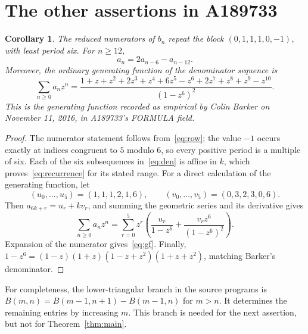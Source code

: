 \documentclass[11pt]{article}
\newtheorem{corollary}[theorem]{Corollary}
\begin{document}
\section{The other assertions in A189733}
\begin{corollary}\label{cor:siblings}
The reduced numerators of $b_n$ repeat the block $(0,1,1,1,0,-1)$, with
least period six. For $n\ge12$,
\begin{equation}\label{eq:recurrence}
 a_n=2a_{n-6}-a_{n-12}.
\end{equation}
Moreover, the ordinary generating function of the denominator sequence is
\begin{equation}\label{eq:gf}
 \sum_{n\ge0}a_nz^n=
 \frac{1+z+z^2+2z^3+z^4+6z^5-z^6+2z^7+z^8+z^9-z^{10}}
 {(1-z^6)^2}.
\end{equation}
This is the generating function recorded as empirical by Colin Barker on
November 11, 2016, in A189733's FORMULA field.
\end{corollary}
\begin{proof}
The numerator statement follows from~\eqref{eq:row}; the value $-1$ occurs
exactly at indices congruent to $5$ modulo $6$, so every positive period
is a multiple of six. Each of the six subsequences in~\eqref{eq:den}
is affine in $k$, which proves~\eqref{eq:recurrence} for its stated range.
For a direct calculation of the generating function, let
\[
 (u_0,\ldots,u_5)=(1,1,1,2,1,6),\qquad
 (v_0,\ldots,v_5)=(0,3,2,3,0,6).
\]
Then $a_{6k+r}=u_r+kv_r$, and summing the geometric series and its
derivative gives
\[
 \sum_{n\ge0}a_nz^n=
 \sum_{r=0}^5z^r\left(\frac{u_r}{1-z^6}
              +\frac{v_rz^6}{(1-z^6)^2}\right).
\]
Expansion of the numerator gives~\eqref{eq:gf}. Finally,
$1-z^6=(1-z)(1+z)(1-z+z^2)(1+z+z^2)$, matching Barker's denominator.
\end{proof}

For completeness, the lower-triangular branch in the source programs is
$B(m,n)=B(m-1,n+1)-B(m-1,n)$ for $m>n$. It determines the remaining
entries by increasing $m$. This branch is needed for the next assertion,
but not for Theorem~\ref{thm:main}.
\end{document}
